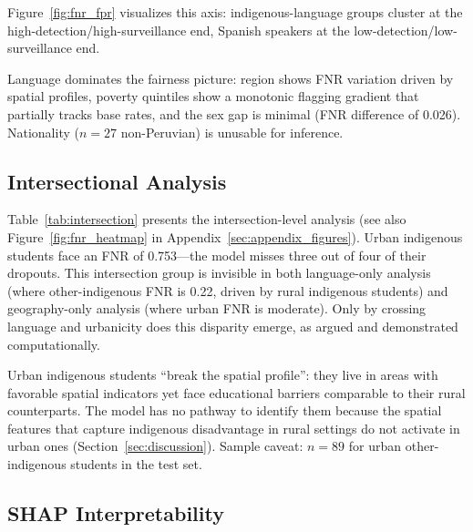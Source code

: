 \documentclass[notitlepage,12pt]{jedm}
\begin{document}
Figure~\ref{fig:fnr_fpr} visualizes this axis: indigenous-language groups cluster at the high-detection/high-surveillance end, Spanish speakers at the low-detection/low-surveillance end.

Language dominates the fairness picture: region shows FNR variation driven by spatial profiles, poverty quintiles show a monotonic flagging gradient that partially tracks base rates, and the sex gap is minimal (FNR difference of 0.026). Nationality ($n=27$ non-Peruvian) is unusable for inference.

\subsection{Intersectional Analysis}

\begin{table}[htbp]
  \caption{Intersection Analysis: Language $\times$ Rurality.}\vspace*{1ex}
  \label{tab:intersection}
  
\end{table}

Table~\ref{tab:intersection} presents the intersection-level analysis (see also Figure~\ref{fig:fnr_heatmap} in Appendix~\ref{sec:appendix_figures}). Urban indigenous students face an FNR of 0.753---the model misses three out of four of their dropouts. This intersection group is invisible in both language-only analysis (where other-indigenous FNR is 0.22, driven by rural indigenous students) and geography-only analysis (where urban FNR is moderate). Only by crossing language and urbanicity does this disparity emerge, as  argued and  demonstrated computationally.

Urban indigenous students ``break the spatial profile'': they live in areas with favorable spatial indicators yet face educational barriers comparable to their rural counterparts. The model has no pathway to identify them because the spatial features that capture indigenous disadvantage in rural settings do not activate in urban ones (Section~\ref{sec:discussion}). Sample caveat: $n=89$ for urban other-indigenous students in the test set.

\subsection{SHAP Interpretability}

\begin{table}[htbp]
  \caption{SHAP Feature Importance (Top 15).}\vspace*{1ex}
  \label{tab:shap}
  
\end{table}
\end{document}
